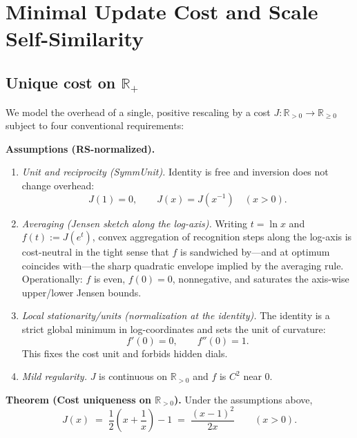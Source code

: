 \documentclass[11pt]{article}
\theoremstyle{definition}
\theoremstyle{remark}
\begin{document}
\section{Minimal Update Cost and Scale Self-Similarity}

\subsection{Unique cost on \texorpdfstring{$\mathbb{R}_+$}{R+}}
We model the overhead of a single, positive rescaling by a cost \(J:\mathbb{R}_{>0}\to\mathbb{R}_{\ge 0}\) subject to four conventional requirements:

\medskip
\noindent\textbf{Assumptions (RS-normalized).}
\begin{enumerate}
  \item \emph{Unit and reciprocity (SymmUnit).} Identity is free and inversion does not change overhead:
  \[
    J(1)=0,\qquad J(x)=J\!\left(x^{-1}\right)\quad(x>0).
  \]
  \item \emph{Averaging (Jensen sketch along the log-axis).} Writing \(t=\ln x\) and \(f(t):=J(e^t)\), convex aggregation of recognition steps along the log-axis is cost-neutral in the tight sense that \(f\) is sandwiched by—and at optimum coincides with—the sharp quadratic envelope implied by the averaging rule. Operationally: \(f\) is even, \(f(0)=0\), nonnegative, and saturates the axis-wise upper/lower Jensen bounds.\hfill %
  \item \emph{Local stationarity/units (normalization at the identity).} The identity is a strict global minimum in log-coordinates and sets the unit of curvature:
  \[
    f'(0)=0,\qquad f''(0)=1.
  \]
  This fixes the cost unit and forbids hidden dials.
  \item \emph{Mild regularity.} \(J\) is continuous on \(\mathbb{R}_{>0}\) and \(f\) is \(C^2\) near \(0\).
\end{enumerate}

\medskip
\noindent\textbf{Theorem (Cost uniqueness on \(\mathbb{R}_{>0}\)).}
Under the assumptions above,
\[
  J(x)\;=\;\frac12\!\left(x+\frac{1}{x}\right)-1\;=\;\frac{(x-1)^2}{2x}\qquad(x>0).
\]
\end{document}
